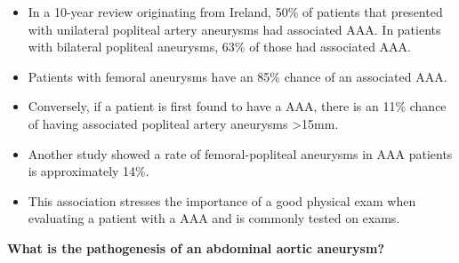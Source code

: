 \documentclass[
]{book}
\begin{document}
\begin{itemize}
  \begin{itemize}
  \item
    In a 10-year review originating from Ireland, 50\% of patients
    that presented with unilateral popliteal artery aneurysms had
    associated AAA. In patients with bilateral popliteal aneurysms,
    63\% of those had associated AAA.
    \citep{duffyPoplitealAneurysms10year1998}
  \item
    Patients with femoral aneurysms have an 85\% chance of an
    associated AAA. \citep{diwanIncidenceFemoralPopliteal2000}
  \item
    Conversely, if a patient is first found to have a AAA, there is
    an 11\% chance of having associated popliteal artery aneurysms
    \textgreater15mm. \citep{tuvesonPatientsAbdominalAortic2016}
  \item
    Another study showed a rate of femoral-popliteal aneurysms in
    AAA patients is approximately 14\%.
    \citep{diwanIncidenceFemoralPopliteal2000}
  \item
    This association stresses the importance of a good physical exam
    when evaluating a patient with a AAA and is commonly tested on
    exams.\citep{chaikof2018, diwan2000}
  \end{itemize}
\end{itemize}

\textbf{What is the pathogenesis of an abdominal aortic aneurysm?}
\citep{mooreVascularEndovascularSurgery2019}
\end{document}
